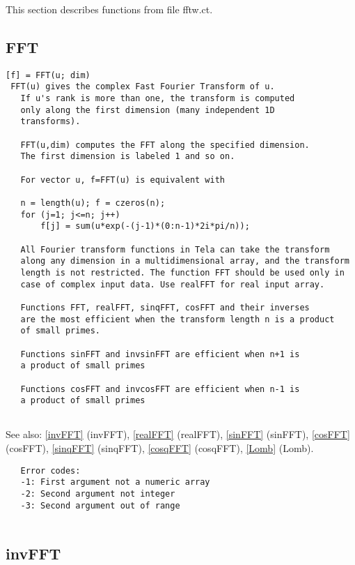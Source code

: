 \documentclass[a4paper]{article}
\begin{document}
This section describes functions from file fftw.ct.




\subsection{FFT\label{FFT}}

\begin{tscreen}
\begin{verbatim}
[f] = FFT(u; dim)
 FFT(u) gives the complex Fast Fourier Transform of u.
   If u's rank is more than one, the transform is computed
   only along the first dimension (many independent 1D
   transforms).

   FFT(u,dim) computes the FFT along the specified dimension.
   The first dimension is labeled 1 and so on.

   For vector u, f=FFT(u) is equivalent with

   n = length(u); f = czeros(n);
   for (j=1; j<=n; j++)
       f[j] = sum(u*exp(-(j-1)*(0:n-1)*2i*pi/n));

   All Fourier transform functions in Tela can take the transform
   along any dimension in a multidimensional array, and the transform
   length is not restricted. The function FFT should be used only in
   case of complex input data. Use realFFT for real input array.

   Functions FFT, realFFT, sinqFFT, cosFFT and their inverses
   are the most efficient when the transform length n is a product
   of small primes.

   Functions sinFFT and invsinFFT are efficient when n+1 is
   a product of small primes
           
   Functions cosFFT and invcosFFT are efficient when n-1 is
   a product of small primes
           
\end{verbatim}

See also: \ref{invFFT} {(invFFT)}, \ref{realFFT} {(realFFT)}, \ref{sinFFT} {(sinFFT)}, \ref{cosFFT} {(cosFFT)}, \ref{sinqFFT} {(sinqFFT)}, \ref{cosqFFT} {(cosqFFT)}, \ref{Lomb} {(Lomb)}.
\begin{verbatim}
   Error codes:
   -1: First argument not a numeric array
   -2: Second argument not integer
   -3: Second argument out of range
   
\end{verbatim}
\end{tscreen}



\subsection{invFFT\label{invFFT}}
\end{document}
